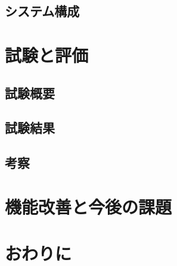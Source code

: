 \documentclass[a4paper]{jsarticle}
\begin{document}
\subsection{システム構成}
\label{sec:architecture}

\section{試験と評価}
\label{sec:evaluation}

\subsection{試験概要}
\label{sec:trial-overview}

\subsection{試験結果}
\label{sec:trial-result}

\subsection{考察}
\label{sec:discussion}

\section{機能改善と今後の課題}
\label{sec:future}

\section{おわりに}
\label{sec:conclusion}



\end{document}

